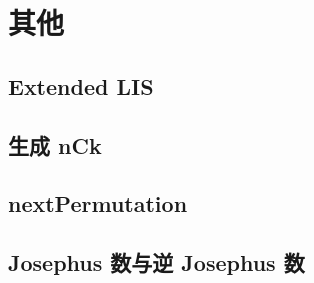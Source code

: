\documentclass[10pt]{article}
\begin{document}
\section{其他}
	\subsection{Extended LIS}
		

	\subsection{生成 nCk}
		

	\subsection{nextPermutation}
		

	\subsection{Josephus 数与逆 Josephus 数}	
		
\end{document}
